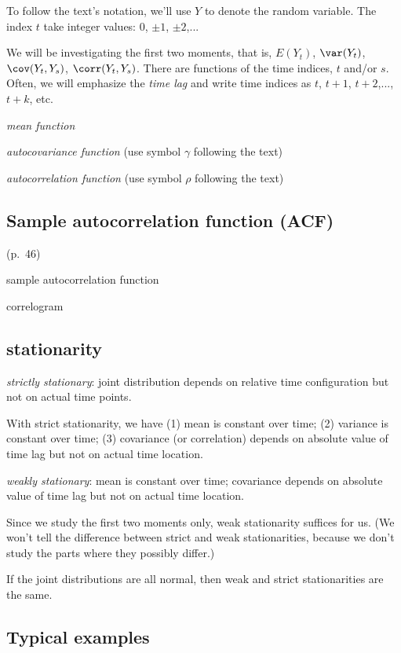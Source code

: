 \documentclass[12pt]{article}
\begin{document}
To follow the text's notation, we'll use $Y$ to denote the random
variable. The index $t$ take integer values: $0$, $\pm 1$, $\pm 2$,...

We will be investigating the first two moments, that is,
$E(Y_t)$, $\var(Y_t)$, $\cov(Y_t, Y_s)$, $\corr(Y_t, Y_s)$.
There are functions of the time indices, $t$ and/or $s$.
Often, we will emphasize the \emph{time lag} and write time indices as
$t$, $t+1$, $t+2$,..., $t+k$, etc.

\emph{mean function}

\emph{autocovariance function} (use symbol $\gamma$ following the text)

\emph{autocorrelation function} (use symbol $\rho$ following the text)


\subsection{Sample autocorrelation function (ACF)}

(p.~46)


sample autocorrelation function

correlogram

\subsection{stationarity}

\emph{strictly stationary}: joint distribution depends on relative time
configuration but not on actual time points.

With strict stationarity, we have
(1) mean is constant over time;
(2) variance is constant over time;
(3) covariance (or correlation) depends on absolute value of
time lag but not on actual time location.

\emph{weakly stationary}: mean is constant over time; covariance
depends on absolute value of time lag but not on actual time
location.

Since we study the first two moments only,
weak stationarity suffices for us.
(We won't tell the difference between strict and weak stationarities,
because we don't study the parts where they possibly differ.)

If the joint distributions are all normal,
then weak and strict stationarities are the same.


\subsection{Typical examples}
\end{document}

